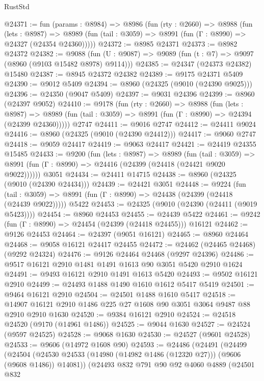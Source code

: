 \begin{lexlean}{RustStd}
\begin{coremodule}
@24371 := fun (params : @8984) =>
  @8986
    (fun (rty : @2660) =>
    @8988
      (fun (lets : @8987) =>
      @8989 (fun (tail : @3059) => @8991 (fun (Γ : @8990) => @24327 (@24354 @24360)))))
@24372 := @8985 @24371
@24373 := @8982 @24372
@24382 := @9088
    (fun (U : @9087) => @9089 (fun (t : @7) => @9097 (@8960 (@9103 @15482 @8978) @9114)))
@24385 := @24347 (@24373 @24382) @15480
@24387 := @8945 @24372 @24382
@24389 := @9175 @24371 @5409
@24390 := @9012 @5409
@24394 := @8960 (@24325 (@9010 (@24390 @9025)))
@24396 := @24350 (@9047 @5409)
@24397 := @9031 @24396
@24399 := @8960 (@24397 @9052)
@24410 := @9178
    (fun (rty : @2660) =>
    @8988
      (fun (lets : @8987) =>
      @8989 (fun (tail : @3059) => @8991 (fun (Γ : @8990) => @24394 (@24399 @24360)))))
    @2747
@24411 := @9016 @2747
@24412 := @24411 @9024
@24416 := @8960 (@24325 (@9010 (@24390 @24412)))
@24417 := @9060 @2747
@24418 := @9059 @24417
@24419 := @9063 @24417
@24421 := @24419 @24355 @15485
@24433 := @9200
    (fun (lets : @8987) =>
    @8989
      (fun (tail : @3059) =>
      @8991 (fun (Γ : @8990) => @24416 (@24399 (@24418 (@24421 @9020 @9022))))))
    @3051
@24434 := @24411 @14715
@24438 := @8960 (@24325 (@9010 (@24390 @24434)))
@24439 := @24421 @3051
@24448 := @9224
    (fun (tail : @3059) => @8991 (fun (Γ : @8990) => @24438 (@24399 (@24418 (@24439 @9022)))))
    @5422
@24453 := @24325 (@9010 (@24390 (@24411 (@9019 @5423))))
@24454 := @8960 @24453
@24455 := @24439 @5422
@24461 := @9242 (fun (Γ : @8990) => @24454 (@24399 (@24418 @24455))) @16121
@24462 := @9126 @24453
@24464 := @24397 (@9051 @16121)
@24465 := @8960 @24464
@24468 := @9058 @16121 @24417 @24455
@24472 := @24462 (@24465 @24468) (@9292 @24324)
@24476 := @9126 @24464 @24468 (@9297 @24396)
@24486 := @9517 @16121 @2910 @1481 @1491 @1613 @90 @3051 @5420 @2910 @1624
@24491 := @9493 @16121 @2910 @1491 @1613 @5420
@24493 := @9502 @16121 @2910
@24499 := @24493 @1488 @1490 @1610 @1612 @5417 @5419
@24501 := @9464 @16121 @2910
@24504 := @24501 @1488 @1610 @5417
@24518 := @14907 @16121 @2910 @1486 @225 @27 @1608 @90 @3051 @3064 @9487 @88 @2910 @2910 @1630
@24520 := @9384 @16121 @2910
@24524 := @24518 @24520 (@9170 (@14961 @1486))
@24525 := @9044 @1630
@24527 := @24524 (@9597 @24525)
@24528 := @9068 @1630
@24530 := @24527 (@9601 @24528)
@24533 := @9606 (@14972 @1608 @90)
@24593 := @24486
    (@24491
      (@24499
        (@24504 (@24530 @24533 (@14980 (@14982 @1486 (@12320 @27))) (@9606 (@9608 @1486)) @14081))
        (@24493
          @832
          @791
          @90
          @92
          @4060
          @4889
          (@24501
            @832

\end{coremodule}
\end{lexlean}
